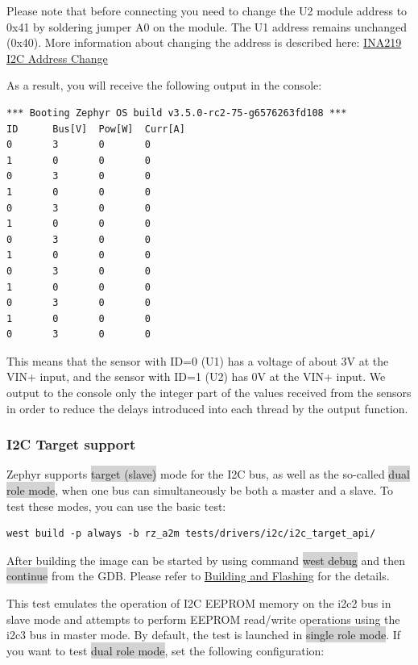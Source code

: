 \documentclass[11pt,a4paper,oneside]{article}
\begin{document}
Please note that before connecting you need to change the U2 module address to 0x41
by soldering jumper A0 on the module. The U1 address remains unchanged (0x40).
More information about changing the address is described here:
\href{https://whatibroke.com/2019/08/10/change-i2c-address-of-ina219/}{INA219 I2C Address Change}

As a result, you will receive the following output in the console:

\begin{lstlisting}
*** Booting Zephyr OS build v3.5.0-rc2-75-g6576263fd108 ***
ID      Bus[V]  Pow[W]  Curr[A]
0       3       0       0
1       0       0       0
0       3       0       0
1       0       0       0
0       3       0       0
1       0       0       0
0       3       0       0
1       0       0       0
0       3       0       0
1       0       0       0
0       3       0       0
1       0       0       0
0       3       0       0
\end{lstlisting}

This means that the sensor with ID=0 (U1) has a voltage of about 3V at the VIN+ input,
and the sensor with ID=1 (U2) has 0V at the VIN+ input. We output to the console only the
integer part of the values received from the sensors in order to reduce the delays
introduced into each thread by the output function.

\subsubsection{I2C Target support}\label{i2c-target-support}

Zephyr supports \colorbox{lightgray}{target (slave)} mode for the I2C bus, as well as the
so-called \colorbox{lightgray}{dual role mode}, when one bus can simultaneously
be both a master and a slave. To test these modes, you can use the basic test:

\begin{lstlisting}
west build -p always -b rz_a2m tests/drivers/i2c/i2c_target_api/
\end{lstlisting}

After building the image can be started by using command \colorbox{lightgray}{west debug}
and then \colorbox{lightgray}{continue} from the GDB. Please refer to
\hyperref[building-and-flashing]{Building and Flashing} for the
details.

This test emulates the operation of I2C EEPROM memory on the i2c2 bus in slave mode
and attempts to perform EEPROM read/write operations using the i2c3 bus in master mode.
By default, the test is launched in \colorbox{lightgray}{single role mode}. If you want to test
\colorbox{lightgray}{dual role mode}, set the following configuration:
\end{document}
